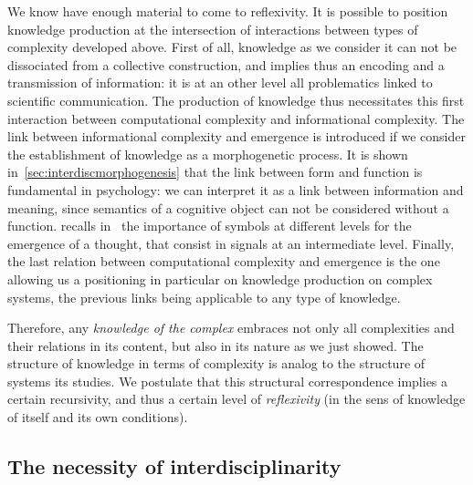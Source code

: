 We know have enough material to come to reflexivity. It is possible to position knowledge production at the intersection of interactions between types of complexity developed above. First of all, knowledge as we consider it can not be dissociated from a collective construction, and implies thus an encoding and a transmission of information: it is at an other level all problematics linked to scientific communication. The production of knowledge thus necessitates this first interaction between computational complexity and informational complexity. The link between informational complexity and emergence is introduced if we consider the establishment of knowledge as a morphogenetic process. It is shown in~\ref{sec:interdiscmorphogenesis} that the link between form and function is fundamental in psychology: we can interpret it as a link between information and meaning, since semantics of a cognitive object can not be considered without a function.  recalls in~\cite{hofstadter1980godel} the importance of symbols at different levels for the emergence of a thought, that consist in signals at an intermediate level. Finally, the last relation between computational complexity and emergence is the one allowing us a positioning in particular on knowledge production on complex systems, the previous links being applicable to any type of knowledge.

Therefore, any \emph{knowledge of the complex} embraces not only all complexities and their relations in its content, but also in its nature as we just showed. The structure of knowledge in terms of complexity is analog to the structure of systems its studies. We postulate that this structural correspondence implies a certain recursivity, and thus a certain level of \emph{reflexivity} (in the sens of knowledge of itself and its own conditions).


\subsection{The necessity of interdisciplinarity}


